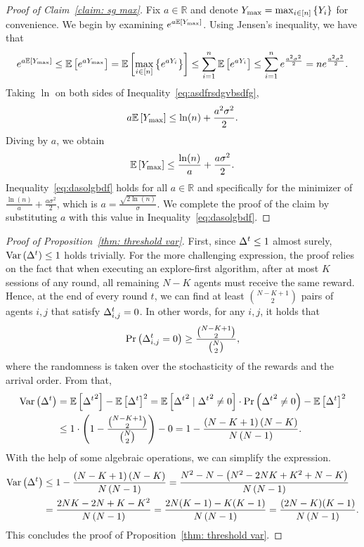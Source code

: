 \begin{proof}[Proof of Claim~\ref{claim: sg max}]
Fix $a \in \mathbb{R}$ and denote $Y_{\textnormal{max}} = \max_{i \in [n]}{\{Y_i\}}$ for convenience.
We begin by examining $e^{a\mathbb{E}\left[ Y_{\textnormal{max}}  \right]}$.
Using Jensen’s inequality, we have that
\begin{align}\label{eq:asdfrsdgvbsdfg}
e^{a\mathbb{E}\left[ Y_{\textnormal{max}}  \right]} \leq \mathbb{E}\left[ e^{a Y_{\textnormal{max}}} \right]= \mathbb{E}\left[ \max_{i \in [n]}{\left\{ e^{a Y_i } \right\}} \right] \leq
\sum_{i=1}^{n}{\mathbb{E}\left[ e^{a Y_i} \right]} \leq \sum_{i=1}^{n}{ e^{\frac{a^2\sigma^2}{2}} } = ne^{\frac{a^2\sigma^2}{2}}.    
\end{align}
Taking $\ln$ on both sides of Inequality~\eqref{eq:asdfrsdgvbsdfg},
\[
a\mathbb{E}\left[ Y_{\textnormal{max}} \right]\leq \ln(n) + \frac{a^2\sigma^2}{2}.
\]
Diving by $a$, we obtain
\begin{align}\label{eq:dasolgbdf}
\mathbb{E}\left[ Y_{\textnormal{max}} \right]\leq \frac{\ln(n)}{a} + \frac{a\sigma^2}{2}.
\end{align}
Inequality~\eqref{eq:dasolgbdf} holds for all $a\in \mathbb{R}$ and specifically for the minimizer of $\frac{\ln{(n)}}{a}\!+\!\frac{a\sigma^2}{2}$, which is $a=\frac{\sqrt{2 \ln{(n)}}}{\sigma}$.
We complete the proof of the claim by substituting $a$ with this value in Inequality~\eqref{eq:dasolgbdf}.
\end{proof}
\begin{proof}[Proof of Proposition~\ref{thm: threshold var}]
    First, since ${\Delta^t} \leq 1$ almost surely, $\mathrm{Var}\left( {\Delta^t} \right) \leq 1$ holds trivially. For the more challenging expression, the proof relies on the fact that when executing an explore-first algorithm, after at most $K$ sessions of any round, all remaining $N-K$ agents must receive the same reward. Hence, at the end of every round $t$, we can find at least $\binom{N-K+1}{2}$ pairs of agents $i,j$ that satisfy $\Delta^t_{i,j} = 0$. In other words, for any $i,j$, it holds that 
    \[
    \Pr\left( {\Delta^t_{i,j}}=0 \right)\geq \frac{\binom{N-K+1}{2}}{\binom{N}{2}},
    \]
    where the randomness is taken over the stochasticity of the rewards and the arrival order. From that,
    \begin{align*}
        \mathrm{Var}\left( {\Delta^t} \right) & = \mathbb{E}\left[ {{\Delta^t}}^2 \right] - \mathbb{E}\left[ {\Delta^t} \right]^2 = \mathbb{E}\left[ {{\Delta^t}}^2 \mid {{\Delta^t}}^2 \neq 0 \right]\cdot \Pr\left( {{\Delta^t}}^2 \neq 0 \right) - \mathbb{E}\left[ {\Delta^t} \right]^2
        \nonumber \\&\leq
        1\cdot \left( 1 - \frac{\binom{N-K+1}{2}}{\binom{N}{2}} \right) - 0 =
        1 - \frac{ \left( N-K+1 \right)\left( N-K \right) }{N\left( N-1 \right)}.
    \end{align*}
    With the help of some algebraic operations, we can simplify the expression.
    \begin{align*}
        \mathrm{Var}\left( {\Delta^t} \right) & \leq
        1 - \frac{ \left( N-K+1 \right)\left( N-K \right) }{N\left( N-1 \right)} =
        \frac{ N^2 - N - \left( N^2 - 2NK + K^2 + N - K \right) }{ N\left( N-1 \right)} 
        \\&=
        \frac{2NK -2N + K -K^2 }{ N\left( N-1 \right)} =
        \frac{2N(K-1) - K(K-1) }{N\left( N-1 \right)} =
        \frac{(2N - K)(K-1) }{N\left( N-1 \right)}.
    \end{align*}
    This concludes the proof of Proposition~\ref{thm: threshold var}.
\end{proof}
